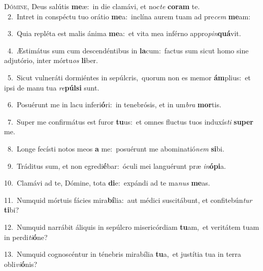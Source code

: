 \lettrine{\initial\textcolor{\initialcolor}{D}}{ómine,} Deus salútis \textbf{me}\-æ:~\star in die clamávi, et noc\textit{te} \textbf{co}\-\textbf{ram} te.\\
{\numbfont\textcolor{\numbcolor}{~2.}}~Intret in conspéctu tuo orátio \textbf{me}\-a:~\star inclína aurem tuam ad pre\textit{cem} \textbf{me}\-am:\par
{\numbfont\textcolor{\numbcolor}{~3.}}~Quia repléta est malis ánima \textbf{me}\-a:~\star et vita mea inférno appro\-\textit{pin}\-\textbf{quá}vit.\par
{\numbfont\textcolor{\numbcolor}{~4.}}~Æstimátus sum cum descendéntibus in \textbf{la}\-cum:~\star factus sum sicut homo sine adjutório, inter mórtu\textit{os} \textbf{li}\-ber.\par
{\numbfont\textcolor{\numbcolor}{~5.}}~Sicut vulneráti dormiéntes in sepúlcris,~\dagger quorum non es memor \textbf{ám}\-plius:~\star et ipsi de manu tua \textit{re}\-\textbf{púl}\textbf{si} sunt.\par
{\numbfont\textcolor{\numbcolor}{~6.}}~Posuérunt me in lacu inferi\-\textbf{ó}\-ri:~\star in tenebrósis, et in um\textit{bra} \textbf{mor}\-tis.\par
{\numbfont\textcolor{\numbcolor}{~7.}}~Super me confirmátus est furor \textbf{tu}\-us:~\star et omnes fluctus tuos induxís\textit{ti} \textbf{su}\-\textbf{per} me.\par
{\numbfont\textcolor{\numbcolor}{~8.}}~Longe fecísti notos meos \textbf{a} me:~\star posuérunt me abominatió\textit{nem} \textbf{si}\-bi.\par
{\numbfont\textcolor{\numbcolor}{~9.}}~Tráditus sum, et non egredi\-\textbf{é}\-bar:~\star óculi mei languérunt præ \textit{in}\-\textbf{ó}\textbf{pi}a.\par
{\numbfont\textcolor{\numbcolor}{10.}}~Clamávi ad te, Dómine, tota \textbf{di}\-e:~\star expándi ad te ma\textit{nus} \textbf{me}\-as.\par
{\numbfont\textcolor{\numbcolor}{11.}}~Numquid mórtuis fácies mira\-\textbf{bí}\-lia:~\star aut médici suscitábunt, et confitebún\textit{tur} \textbf{ti}\-bi?\par
{\numbfont\textcolor{\numbcolor}{12.}}~Numquid narrábit áliquis in sepúlcro misericórdiam \textbf{tu}\-am,~\star et veritátem tuam in perdi\-\textit{ti}\-\textbf{ó}ne?\par
{\numbfont\textcolor{\numbcolor}{13.}}~Numquid cognoscéntur in ténebris mirabília \textbf{tu}\-a,~\star et justítia tua in terra obli\-\textit{vi}\-\textbf{ó}nis?\par
